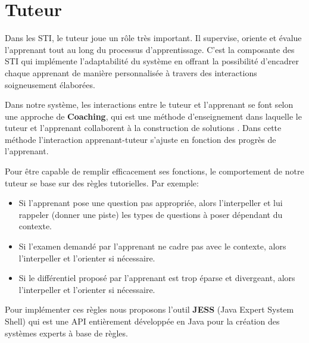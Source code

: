 \newpage


\section{Tuteur}

Dans les STI, le tuteur joue un rôle très important. Il supervise, oriente et évalue l'apprenant tout au long du processus d'apprentissage. C'est la composante des STI qui implémente l'adaptabilité du système en
offrant la possibilité d'encadrer chaque apprenant de manière personnalisée à travers des interactions soigneusement élaborées.

Dans notre système, les interactions entre le tuteur et l'apprenant se font selon une approche de \textbf{Coaching}, qui est une méthode d'enseignement dans laquelle le tuteur et l'apprenant collaborent à la construction de solutions \cite{vanlehn1996conceptual}. Dans cette méthode l'interaction apprenant-tuteur s'ajuste en fonction des progrès de l'apprenant. 

Pour être capable de remplir efficacement ses fonctions, le comportement de notre tuteur se base sur des règles tutorielles. Par exemple:
\begin{itemize}
    \item Si l'apprenant pose une question pas appropriée, alors l'interpeller et lui rappeler (donner une piste) les types de questions à poser dépendant du contexte.
    \item Si l'examen demandé par l'apprenant ne cadre pas avec le contexte, alors l'interpeller et l'orienter si nécessaire.
    \item Si le différentiel proposé par l'apprenant est trop éparse et divergeant, alors l'interpeller et l'orienter si nécessaire.
\end{itemize}


Pour implémenter ces règles nous proposons l'outil \textbf{JESS} (Java Expert System Shell) qui est une API entièrement développée en Java pour la création des systèmes experts à base de règles.